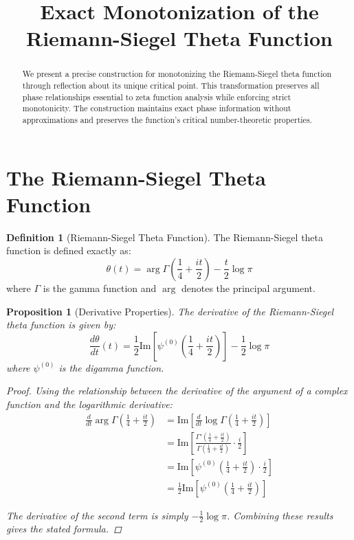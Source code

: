 \documentclass{article}
\title{Exact Monotonization of the Riemann-Siegel Theta Function}
\author{}
\date{}
\newtheorem{proposition}[theorem]{Proposition}
\theoremstyle{definition}
\newtheorem{definition}[theorem]{Definition}
\begin{document}
\maketitle

\begin{abstract}
We present a precise construction for monotonizing the Riemann-Siegel theta function through reflection about its unique critical point. This transformation preserves all phase relationships essential to zeta function analysis while enforcing strict monotonicity. The construction maintains exact phase information without approximations and preserves the function's critical number-theoretic properties.
\end{abstract}

\section{The Riemann-Siegel Theta Function}

\begin{definition}[Riemann-Siegel Theta Function]
The Riemann-Siegel theta function is defined exactly as:
\begin{equation}
\theta(t) = \arg\Gamma\left(\frac{1}{4} + \frac{it}{2}\right) - \frac{t}{2}\log\pi
\end{equation}
where $\Gamma$ is the gamma function and $\arg$ denotes the principal argument.
\end{definition}

\begin{proposition}[Derivative Properties]
The derivative of the Riemann-Siegel theta function is given by:
\begin{equation}
\frac{d\theta}{dt}(t) = \frac{1}{2}\text{Im}\left[\psi^{(0)}\left(\frac{1}{4} + \frac{it}{2}\right)\right] - \frac{1}{2}\log\pi
\end{equation}
where $\psi^{(0)}$ is the digamma function.

\begin{proof}
Using the relationship between the derivative of the argument of a complex function and the logarithmic derivative:
\begin{align}
\frac{d}{dt}\arg\Gamma\left(\frac{1}{4} + \frac{it}{2}\right) &= \text{Im}\left[\frac{d}{dt}\log\Gamma\left(\frac{1}{4} + \frac{it}{2}\right)\right] \\
&= \text{Im}\left[\frac{\Gamma'(\frac{1}{4} + \frac{it}{2})}{\Gamma(\frac{1}{4} + \frac{it}{2})} \cdot \frac{i}{2}\right] \\
&= \text{Im}\left[\psi^{(0)}\left(\frac{1}{4} + \frac{it}{2}\right) \cdot \frac{i}{2}\right] \\
&= \frac{1}{2}\text{Im}\left[\psi^{(0)}\left(\frac{1}{4} + \frac{it}{2}\right)\right]
\end{align}

The derivative of the second term is simply $-\frac{1}{2}\log\pi$. Combining these results gives the stated formula.
\end{proof}
\end{proposition}
\end{document}
